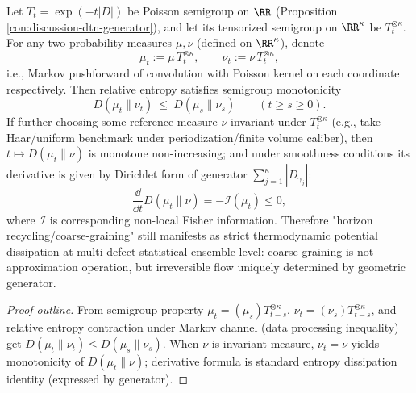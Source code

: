 \begin{proposition}\label{prop:xi-pick-poisson-poisson-semigroup-free-energy-dissipation}
Let \(T_t=\exp(-t|D|)\) be Poisson semigroup on \(\RR\) (Proposition \ref{con:discussion-dtn-generator}), and let its tensorized semigroup on \(\RR^\kappa\) be \(T_t^{\otimes \kappa}\).
For any two probability measures \(\mu,\nu\) (defined on \(\RR^\kappa\)), denote
\[
\mu_t:=\mu\,T_t^{\otimes\kappa},\qquad \nu_t:=\nu\,T_t^{\otimes\kappa},
\]
i.e., Markov pushforward of convolution with Poisson kernel on each coordinate respectively.
Then relative entropy satisfies semigroup monotonicity
\[
\boxed{\;
D(\mu_t\|\nu_t)\ \le\ D(\mu_s\|\nu_s)\qquad(t\ge s\ge 0).\;}
\]
If further choosing some reference measure \(\nu\) invariant under \(T_t^{\otimes\kappa}\) (e.g., take Haar/uniform benchmark under periodization/finite volume caliber), then \(t\mapsto D(\mu_t\|\nu)\) is monotone non-increasing;
and under smoothness conditions its derivative is given by Dirichlet form of generator \(\sum_{j=1}^{\kappa}|D_{\gamma_j}|\):
\[
\frac{\dd}{\dd t}D(\mu_t\|\nu)=-\mathcal{I}(\mu_t)\le 0,
\]
where \(\mathcal{I}\) is corresponding non-local Fisher information.
Therefore "horizon recycling/coarse-graining" still manifests as strict thermodynamic potential dissipation at multi-defect statistical ensemble level: coarse-graining is not approximation operation, but irreversible flow uniquely determined by geometric generator.
\end{proposition}
\begin{proof}[Proof outline]
From semigroup property \(\mu_t=(\mu_s)T_{t-s}^{\otimes\kappa}\), \(\nu_t=(\nu_s)T_{t-s}^{\otimes\kappa}\),
and relative entropy contraction under Markov channel (data processing inequality) get
\(
D(\mu_t\|\nu_t)\le D(\mu_s\|\nu_s)
\).
When \(\nu\) is invariant measure, \(\nu_t=\nu\) yields monotonicity of \(D(\mu_t\|\nu)\); derivative formula is standard entropy dissipation identity (expressed by generator).
\end{proof}


